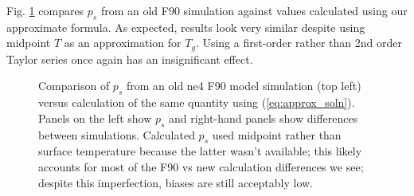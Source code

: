 Fig. \ref{fig:psl_vs_v0} compares $p_s$ from an old F90 simulation against values calculated using our approximate formula. As expected, results look very similar despite using midpoint $T$ as an approximation for $T_g$. Using a first-order rather than 2nd order Taylor series once again has an insignificant effect. 
\begin{figure}[ht]
\noindent
\centering
{}
\caption{Comparison of $p_s$ from an old ne4 F90 model simulation (top left) versus calculation of the same quantity using (\ref{eq:approx_soln}). Panels on the left show $p_s$ and right-hand panels show differences between simulations. Calculated $p_s$ used midpoint rather than surface temperature because the latter wasn't available; this likely accounts for most of the F90 vs new calculation differences we see; despite this imperfection, biases are still acceptably low.} 
\label{fig:psl_vs_v0}
\end{figure}

